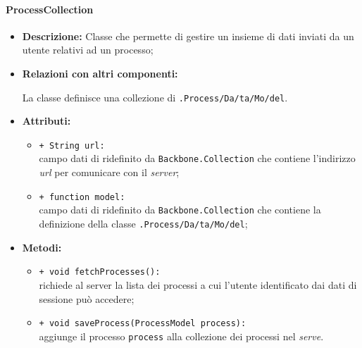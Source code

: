 \paragraph{ProcessCollection}
\label{processCollection}
\begin{flushleft}
\begin{itemize}
\item \textbf{Descrizione:} Classe che permette di gestire un insieme di dati inviati da un utente relativi ad un processo;
\item \textbf{Relazioni con altri componenti:}
\begin{sloppypar}
La classe definisce una collezione di \texttt{\model{}.Process\fshyp{}Da\fshyp{}ta\fshyp{}Mo\fshyp{}del}.
\end{sloppypar}
\item \textbf{Attributi:}
\begin{sloppypar}
\begin{itemize}
\item \texttt{+ String url:}\\ campo dati di ridefinito da \texttt{Backbone.Collection} che contiene l'indirizzo \textit{url} per comunicare con il \textit{server};
\item \texttt{+ function model:}\\ campo dati di ridefinito da \texttt{Backbone.Collection} che contiene la definizione della classe \texttt{\model{}.Process\fshyp{}Da\fshyp{}ta\fshyp{}Mo\fshyp{}del};
\end{itemize}
\end{sloppypar}
\item \textbf{Metodi:}
\begin{sloppypar}
\begin{itemize}
\item \texttt{+ void fetchProcesses():}\\ richiede al server la lista dei processi a cui l'utente identificato dai dati di sessione può accedere;
\item \texttt{+ void saveProcess(ProcessModel process):}\\ aggiunge il processo \texttt{process} alla collezione dei processi nel \textit{serve}.
\end{itemize}
\end{sloppypar}
\end{itemize}
\end{flushleft}

